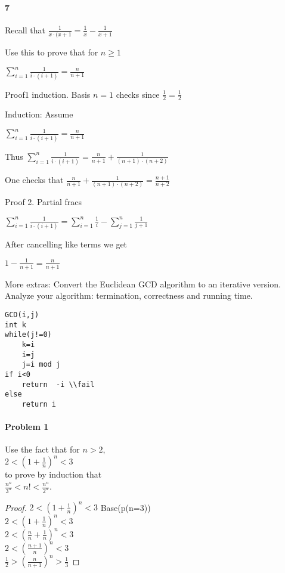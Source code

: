 \documentclass[10 pt]{article}
\begin{document}
\begin{multicols}{2}
\paragraph{7} Recall that $\frac{1}{x \cdot (x+1} = \frac{1}{x} - \frac{1}{x+1}$

Use this to prove that for $n \geq 1$

$\sum\limits_{i=1}^n \frac{1}{i \cdot (i+1)} = \frac{n}{n+1}$

Proof1 induction. Basis $n=1$ checks since $\frac{1}{2}=\frac{1}{2}$

Induction: Assume

$\sum\limits_{i=1}^n \frac{1}{i \cdot (i+1)} = \frac{n}{n+1}$

Thus
$\sum\limits_{i=1}^n \frac{1}{i \cdot (i+1)} = \frac{n}{n+1}+ \frac{1}{(n+1) \cdot (n+2)}$

One checks that 
$\frac{n}{n+1}+ \frac{1}{(n+1) \cdot (n+2)} = \frac{n+1}{n+2}$

Proof 2. Partial fracs

$\sum\limits_{i=1}^n \frac{1}{i \cdot (i+1)} =\sum\limits_{i=1}^n \frac{1}{i} - \sum\limits_{j=1}^n \frac{1}{j+1}$

After cancelling like terms we get 

$1- \frac{1}{n+1}= \frac{n}{n+1}$


More extras:
 Convert the Euclidean GCD algorithm to an iterative version. Analyze your algorithm: termination, correctness and running time.

\begin{verbatim}
GCD(i,j)
int k
while(j!=0)
    k=i
    i=j
    j=i mod j
if i<0 
    return  -i \\fail
else
    return i
\end{verbatim}



\paragraph{Problem 1} Use the fact that for $n > 2$, \hfill \\
$2 < (1 + \frac{1}{n})^n < 3$\\
to prove by induction that \hfill \\
$\frac{n^n}{3^n} < n! < \frac{n^n}{2^n}$.

\begin{proof}
$2 < (1 + \frac{1}{n})^n < 3$
Base(p(n=3))\\
$2<(1+\frac{1}{n})^n<3$\\
$2<(\frac{n}{n} +\frac{1}{n})^n<3$\\
$2<(\frac{n+1}{n})^n<3$\\
$\frac{1}{2} > (\frac{n}{n+1})^n > \frac{1}{3}$
\end{proof}


\end{multicols}
\end{document}
